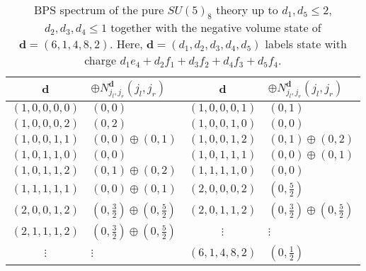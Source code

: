 \begin{table}
	\centering
	\begin{tabular}{|c|C{25ex}||c|C{25ex}|} \hline
		$\mathbf{d}$ & $\oplus N_{j_l, j_r}^{\mathbf{d}} (j_l, j_r)$ & $\mathbf{d}$ & $\oplus N_{j_l, j_r}^{\mathbf{d}} (j_l, j_r)$ \\ \hline
			$ (1, 0, 0, 0, 0) $ & $ (0, 0) $ & $ (1, 0, 0, 0, 1) $ & $ (0, 1) $ \\ \hline
			$ (1, 0, 0, 0, 2) $ & $ (0, 2) $ & $ (1, 0, 0, 1, 0) $ & $ (0, 0) $ \\ \hline
			$ (1, 0, 0, 1, 1) $ & $ (0, 0) \oplus (0, 1) $ & $ (1, 0, 0, 1, 2) $ & $ (0, 1) \oplus (0, 2) $ \\ \hline
			$ (1, 0, 1, 1, 0) $ & $ (0, 0) $ & $ (1, 0, 1, 1, 1) $ & $ (0, 0) \oplus (0, 1) $  \\ \hline
			$ (1, 0, 1, 1, 2) $ & $ (0, 1) \oplus (0, 2) $ & $ (1, 1, 1, 1, 0) $ & $ (0, 0) $ \\ \hline
			$ (1, 1, 1, 1, 1) $ & $ (0, 0) \oplus (0, 1) $ & $ (2, 0, 0, 0, 2) $ & $ (0, \frac{5}{2}) $ \\ \hline
			$ (2, 0, 0, 1, 2) $ & $ (0, \frac{3}{2}) \oplus (0, \frac{5}{2}) $ & $ (2, 0, 1, 1, 2) $ & $ (0, \frac{3}{2}) \oplus (0, \frac{5}{2}) $ \\ \hline
			$ (2, 1, 1, 1, 2) $ & $ (0, \frac{3}{2}) \oplus (0, \frac{5}{2}) $ & $ \vdots$ & $ \vdots $ \\ \hline
			$ \vdots $ & $ \vdots $ & $ (6, 1, 4, 8, 2) $ & $ (0, \frac{1}{2}) $ \\ \hline
	\end{tabular}
	\caption{BPS spectrum of the pure $ SU(5)_8 $ theory up to $ d_1, d_5 \leq 2 $, $ d_2, d_3, d_4 \leq 1$ together with the negative volume state of $ \mathbf{d} = (6, 1, 4, 8, 2) $. Here, $ \mathbf{d} = (d_1, d_2, d_3, d_4, d_5) $ labels state with charge $ d_1 e_4 + d_2 f_1 + d_3 f_2 + d_4 f_3 + d_5 f_4 $.} \label{table:SU5_8}
\end{table}

